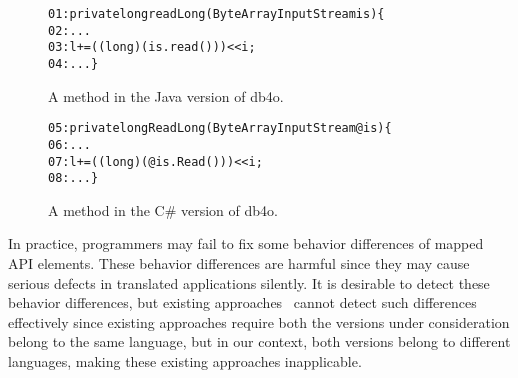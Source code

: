\begin{figure}[t]
\begin{CodeOut}%
\begin{alltt}
01: private long readLong(ByteArrayInputStream is)\{
02:  ...
03:  l += ((long) (is.read())) << i;
04: ...\}
\end{alltt}
\end{CodeOut}\vspace*{-4ex}
\caption{A method in the Java version of db4o.}\vspace*{-2ex}
\label{fig:db4ojava}
\begin{CodeOut}%
\begin{alltt}
05: private long ReadLong(ByteArrayInputStream @is)\{
06:  ...
07:  l += ((long)(@is.Read())) << i;
08:  ...\}
\end{alltt}
\end{CodeOut}\vspace*{-4ex}
\caption{A method in the C\# version of db4o.}\vspace*{-4ex}
\label{fig:db40net}
\end{figure}

In practice, programmers may fail to fix some behavior differences of mapped API elements. These behavior differences are harmful since they may cause serious defects in translated applications silently. It is desirable to detect these behavior differences, but existing approaches~\cite{taneja08diffgen, mckeeman1998differential} cannot detect such differences effectively since existing approaches require both the versions under consideration belong to the same language, but in our context, both versions belong to different languages, making these existing approaches inapplicable.


